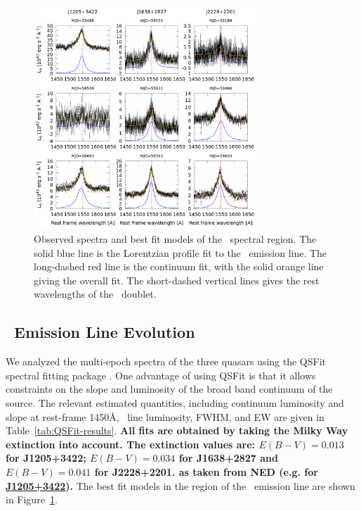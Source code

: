 \documentclass[fleqn,usenatbib]{mnras}
\begin{document}
\begin{figure}
  \centering
  \includegraphics[width=8.40cm, trim=0.37cm 0.3cm 0.0cm 0.2cm, clip]{figures/CIVregions.png}
    \vspace{-18pt}
  \caption{Observed spectra and best fit models of the \civ\ spectral region.
    The solid blue line is the Lorentzian profile fit to the \civ\ emission line.
    The long-dashed red line is the continuum fit, with the solid orange
    line giving the overall fit. The short-dashed vertical lines gives the
    rest wavelengths of the \civ\ doublet. }
  \label{fig:QSFit-CIV}
\end{figure}

\subsection{\civ\ Emission Line Evolution}
We analyzed the multi-epoch spectra of the three quasars using the
QSFit spectral fitting package \citep{Calderone2017}.  One advantage
of using QSFit is that it allows constraints on the slope and
luminosity of the broad band continuum of the source. The relevant
estimated quantities, including continuum luminosity and slope at
rest-frame 1450\AA, \civ\ line luminosity, FWHM, and EW are given in
Table~\ref{tab:QSFit-results}.
{\bf 
All fits are obtained by taking the Milky Way extinction
\citep{Schlafly2011} into account.  The extinction values are: $E(B-V)
=0.013$ for J1205+3422; $E(B-V) =0.034$ for J1638+2827 and $E(B-V)
=0.041$ for J2228+2201.  as taken from NED (e.g. for
\href{http://ned.ipac.caltech.edu/cgi-bin/objsearch?search_type=Near+Position+Search&in_csys=Equatorial&in_equinox=J2000.0&lon=12%3A05%3A44.7&lat=%2B34%3A22%3A52.4&radius=0.1&hconst=73&omegam=0.27&omegav=0.73&corr_z=1&z_constraint=Unconstrained&z_value1=&z_value2=&z_unit=z&ot_include=ANY&nmp_op=ANY&out_csys=Equatorial&out_equinox=J2000.0&obj_sort=Distance+to+search+center&of=pre_text&zv_breaker=30000.0&list_limit=5&img_stamp=YES#GalacticExtinction_0}{J1205+3422}).
}
The best fit models
in the region of the \civ\ emission line are shown in
Figure~\ref{fig:QSFit-CIV}.
\end{document}
